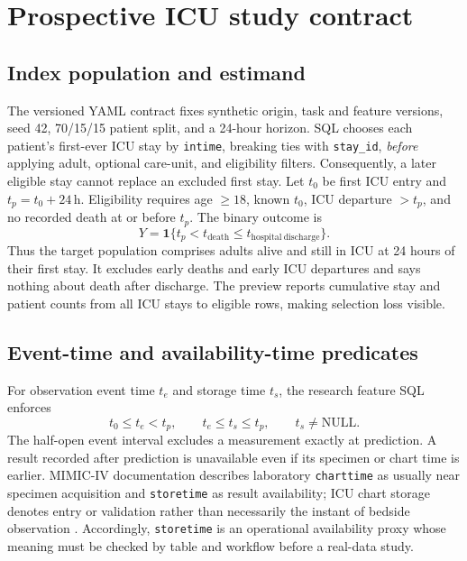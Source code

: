 \documentclass[11pt,a4paper]{article}
\begin{document}
\section{Prospective ICU study contract}

\subsection{Index population and estimand}

The versioned YAML contract fixes synthetic origin, task and feature versions, seed 42, 70/15/15 patient split, and a 24-hour horizon. SQL chooses each patient's first-ever ICU stay by \texttt{intime}, breaking ties with \texttt{stay\_id}, \emph{before} applying adult, optional care-unit, and eligibility filters. Consequently, a later eligible stay cannot replace an excluded first stay. Let $t_0$ be first ICU entry and $t_p=t_0+24\,\mathrm{h}$. Eligibility requires age $\geq18$, known $t_0$, ICU departure $>t_p$, and no recorded death at or before $t_p$. The binary outcome is
\begin{equation}
Y=\mathbf{1}\{t_p<t_{\mathrm{death}}\leq t_{\mathrm{hospital\ discharge}}\}.
\end{equation}
Thus the target population comprises adults alive and still in ICU at 24 hours of their first stay. It excludes early deaths and early ICU departures and says nothing about death after discharge. The preview reports cumulative stay and patient counts from all ICU stays to eligible rows, making selection loss visible.

\subsection{Event-time and availability-time predicates}

For observation event time $t_e$ and storage time $t_s$, the research feature SQL enforces
\begin{equation}
 t_0\leq t_e<t_p,\qquad t_e\leq t_s\leq t_p,\qquad t_s\ne\mathrm{NULL}.
\label{eq:timing}
\end{equation}
The half-open event interval excludes a measurement exactly at prediction. A result recorded after prediction is unavailable even if its specimen or chart time is earlier. MIMIC-IV documentation describes laboratory \texttt{charttime} as usually near specimen acquisition and \texttt{storetime} as result availability; ICU chart storage denotes entry or validation rather than necessarily the instant of bedside observation \cite{labevents,icuevents}. Accordingly, \texttt{storetime} is an operational availability proxy whose meaning must be checked by table and workflow before a real-data study.
\end{document}
